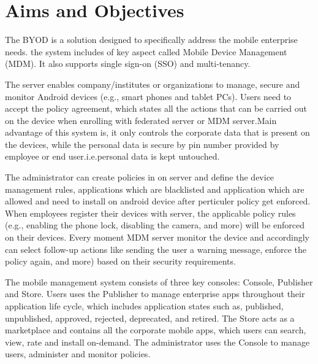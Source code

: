 \graphicspath{ {images/} }
\chapter{Aims and Objectives}
\thispagestyle{empty}
\par \hspace{5mm} The BYOD is a solution designed to specifically address the mobile enterprise needs. the system includes of key aspect called Mobile Device Management (MDM). It also supports single sign-on (SSO) and multi-tenancy. 

\par The server enables company/institutes or organizations to manage, secure and monitor Android devices (e.g., smart phones and tablet PCs). Users need to accept the policy agreement, which states all the actions that can be carried out on the device when enrolling with federated server or MDM server.Main advantage of this system is, it only controls the corporate data that is present on the devices, while the personal data is secure by pin number provided by employee or end user.i.e.personal data is kept untouched.

\par The administrator can create policies in on server and define the device management rules, applications which are blacklisted and application which are allowed and need to install on android device after perticuler policy get enforced. When employees register their devices with server, the applicable policy rules (e.g., enabling the phone lock, disabling the camera, and more) will be enforced on their devices. Every moment MDM server monitor the device and accordingly can select follow-up actions like sending the user a warning message, enforce the policy again, and more) based on their security requirements.  

\par The mobile management system consists of three key consoles: Console, Publisher and Store. Users uses the Publisher to manage enterprise apps throughout their application life cycle, which includes application states such as, published, unpublished, approved, rejected, deprecated, and retired. The Store acts as a marketplace and contains all the corporate mobile apps, which users can search, view, rate and install on-demand. The administrator uses the Console to manage users, administer and monitor policies.

